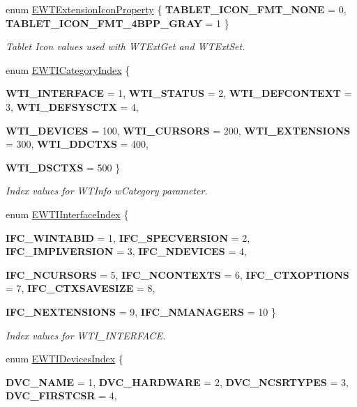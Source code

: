 \begin{DoxyCompactItemize}
enum \hyperlink{namespace_wintab_d_n_a4fb4432ff158db77a634fed851e23f6f}{EWTExtensionIconProperty} \{ {\bfseries TABLET\_\-ICON\_\-FMT\_\-NONE} =  0, 
{\bfseries TABLET\_\-ICON\_\-FMT\_\-4BPP\_\-GRAY} =  1
 \}
\begin{DoxyCompactList}\small\item\em Tablet Icon values used with WTExtGet and WTExtSet. \item\end{DoxyCompactList}\item 
enum \hyperlink{namespace_wintab_d_n_aeb27579e91c95fb5a7bf4a4a9dc7f875}{EWTICategoryIndex} \{ \par
{\bfseries WTI\_\-INTERFACE} =  1, 
{\bfseries WTI\_\-STATUS} =  2, 
{\bfseries WTI\_\-DEFCONTEXT} =  3, 
{\bfseries WTI\_\-DEFSYSCTX} =  4, 
\par
{\bfseries WTI\_\-DEVICES} =  100, 
{\bfseries WTI\_\-CURSORS} =  200, 
{\bfseries WTI\_\-EXTENSIONS} =  300, 
{\bfseries WTI\_\-DDCTXS} =  400, 
\par
{\bfseries WTI\_\-DSCTXS} =  500
 \}
\begin{DoxyCompactList}\small\item\em Index values for WTInfo wCategory parameter. \item\end{DoxyCompactList}\item 
enum \hyperlink{namespace_wintab_d_n_a9db915754a02c42282c3766bfbafabe4}{EWTIInterfaceIndex} \{ \par
{\bfseries IFC\_\-WINTABID} =  1, 
{\bfseries IFC\_\-SPECVERSION} =  2, 
{\bfseries IFC\_\-IMPLVERSION} =  3, 
{\bfseries IFC\_\-NDEVICES} =  4, 
\par
{\bfseries IFC\_\-NCURSORS} =  5, 
{\bfseries IFC\_\-NCONTEXTS} =  6, 
{\bfseries IFC\_\-CTXOPTIONS} =  7, 
{\bfseries IFC\_\-CTXSAVESIZE} =  8, 
\par
{\bfseries IFC\_\-NEXTENSIONS} =  9, 
{\bfseries IFC\_\-NMANAGERS} =  10
 \}
\begin{DoxyCompactList}\small\item\em Index values for WTI\_\-INTERFACE. \item\end{DoxyCompactList}\item 
enum \hyperlink{namespace_wintab_d_n_a87e63128e31d86cb418e895f3d58565c}{EWTIDevicesIndex} \{ \par
{\bfseries DVC\_\-NAME} =  1, 
{\bfseries DVC\_\-HARDWARE} =  2, 
{\bfseries DVC\_\-NCSRTYPES} =  3, 
{\bfseries DVC\_\-FIRSTCSR} =  4, 
\par

\end{DoxyCompactItemize}
